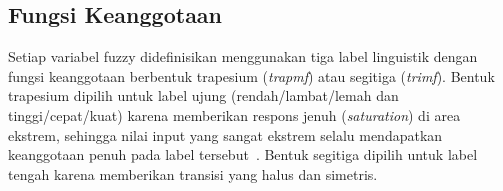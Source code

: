 




\subsection{Fungsi Keanggotaan}
\label{sec:fuzzy_mf}

Setiap variabel fuzzy didefinisikan menggunakan tiga label linguistik dengan fungsi keanggotaan berbentuk trapesium (\textit{trapmf}) atau segitiga (\textit{trimf}). Bentuk trapesium dipilih untuk label ujung (rendah/lambat/lemah dan tinggi/cepat/kuat) karena memberikan respons jenuh (\textit{saturation}) di area ekstrem, sehingga nilai input yang sangat ekstrem selalu mendapatkan keanggotaan penuh pada label tersebut~\cite{Benaicha2026}. Bentuk segitiga dipilih untuk label tengah karena memberikan transisi yang halus dan simetris.

